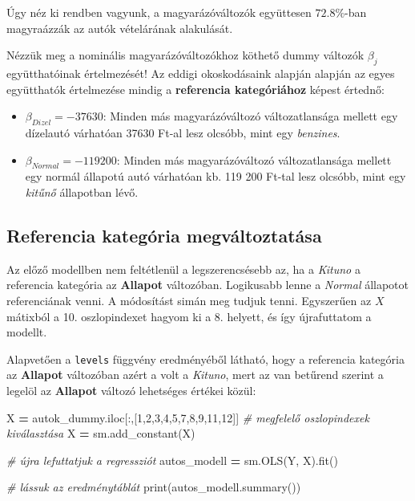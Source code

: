 \documentclass[
]{book}
\newenvironment{Shaded}{\begin{snugshade}}{\end{snugshade}}
\newcommand{\BuiltInTok}[1]{#1}
\newcommand{\CommentTok}[1]{\textcolor[rgb]{0.56,0.35,0.01}{\textit{#1}}}
\newcommand{\DecValTok}[1]{\textcolor[rgb]{0.00,0.00,0.81}{#1}}
\newcommand{\NormalTok}[1]{#1}
\newcommand{\OperatorTok}[1]{\textcolor[rgb]{0.81,0.36,0.00}{\textbf{#1}}}
\providecommand{\tightlist}{%
  \setlength{\itemsep}{0pt}\setlength{\parskip}{0pt}}
\begin{document}
Úgy néz ki rendben vagyunk, a magyarázóváltozók együttesen \(72.8\%\)-ban magyraázzák az autók vételárának alakulását.

Nézzük meg a nominális magyarázóváltozókhoz köthető dummy változók \(\beta_j\) együtthatóinak értelmezését! Az eddigi okoskodásaink alapján alapján az egyes együtthatók értelmezése mindig a \textbf{referencia kategóriához} képest értednő:

\begin{itemize}
\tightlist
\item
  \(\beta_{Dizel}=-37630\): Minden más magyarázóváltozó változatlansága mellett egy dízelautó várhatóan 37630 Ft-al lesz olcsóbb, mint egy \emph{benzines}.
\item
  \(\beta_{Normal}=-119200\): Minden más magyarázóváltozó változatlansága mellett egy normál állapotú autó várhatóan kb. 119 200 Ft-tal lesz olcsóbb, mint egy \emph{kitűnő} állapotban lévő.
\end{itemize}

\subsection{Referencia kategória megváltoztatása}\label{referencia-kateguxf3ria-megvuxe1ltoztatuxe1sa}

Az előző modellben nem feltétlenül a legszerencsésebb az, ha a \emph{Kituno} a referencia kategória az \textbf{Allapot} változóban. Logikusabb lenne a \emph{Normal} állapotot referenciának venni. A módosítást simán meg tudjuk tenni. Egyszerűen az \(X\) mátixból a 10. oszlopindexet hagyom ki a 8. helyett, és így újrafuttatom a modellt.

Alapvetően a \texttt{levels} függvény eredményéből látható, hogy a referencia kategória az \textbf{Allapot} változóban azért a volt a \emph{Kituno}, mert az van betűrend szerint a legelöl az \textbf{Allapot} változó lehetséges értékei közül:

\begin{Shaded}
\begin{Highlighting}[]
\NormalTok{X }\OperatorTok{=}\NormalTok{ autok\_dummy.iloc[:,[}\DecValTok{1}\NormalTok{,}\DecValTok{2}\NormalTok{,}\DecValTok{3}\NormalTok{,}\DecValTok{4}\NormalTok{,}\DecValTok{5}\NormalTok{,}\DecValTok{7}\NormalTok{,}\DecValTok{8}\NormalTok{,}\DecValTok{9}\NormalTok{,}\DecValTok{11}\NormalTok{,}\DecValTok{12}\NormalTok{]] }\CommentTok{\# megfelelő oszlopindexek kiválasztása}
\NormalTok{X }\OperatorTok{=}\NormalTok{ sm.add\_constant(X)}

\CommentTok{\# újra lefuttatjuk a regressziót}
\NormalTok{autos\_modell }\OperatorTok{=}\NormalTok{ sm.OLS(Y, X).fit()}

\CommentTok{\# lássuk az eredménytáblát}
\BuiltInTok{print}\NormalTok{(autos\_modell.summary())}
\end{Highlighting}
\end{Shaded}
\end{document}
